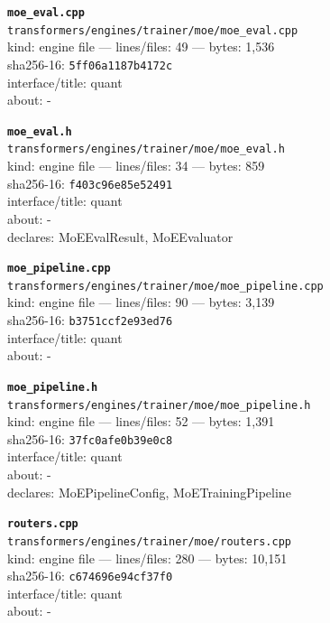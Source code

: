 \noindent\textbf{\texttt{moe\_eval.cpp}}\\
\texttt{transformers/engines/trainer/moe/moe\_eval.cpp}\\
kind: engine file --- lines/files: 49 --- bytes: 1,536\\
sha256-16: \texttt{5ff06a1187b4172c}\\
interface/title: quant\\
about: -\\
\vspace*{6.0pt}

\noindent\textbf{\texttt{moe\_eval.h}}\\
\texttt{transformers/engines/trainer/moe/moe\_eval.h}\\
kind: engine file --- lines/files: 34 --- bytes: 859\\
sha256-16: \texttt{f403c96e85e52491}\\
interface/title: quant\\
about: -\\
declares: MoEEvalResult, MoEEvaluator\\
\vspace*{6.0pt}
\newpage

\noindent\textbf{\texttt{moe\_pipeline.cpp}}\\
\texttt{transformers/engines/trainer/moe/moe\_pipeline.cpp}\\
kind: engine file --- lines/files: 90 --- bytes: 3,139\\
sha256-16: \texttt{b3751ccf2e93ed76}\\
interface/title: quant\\
about: -\\
\vspace*{6.0pt}

\noindent\textbf{\texttt{moe\_pipeline.h}}\\
\texttt{transformers/engines/trainer/moe/moe\_pipeline.h}\\
kind: engine file --- lines/files: 52 --- bytes: 1,391\\
sha256-16: \texttt{37fc0afe0b39e0c8}\\
interface/title: quant\\
about: -\\
declares: MoEPipelineConfig, MoETrainingPipeline\\
\vspace*{6.0pt}

\noindent\textbf{\texttt{routers.cpp}}\\
\texttt{transformers/engines/trainer/moe/routers.cpp}\\
kind: engine file --- lines/files: 280 --- bytes: 10,151\\
sha256-16: \texttt{c674696e94cf37f0}\\
interface/title: quant\\
about: -\\
\vspace*{6.0pt}

